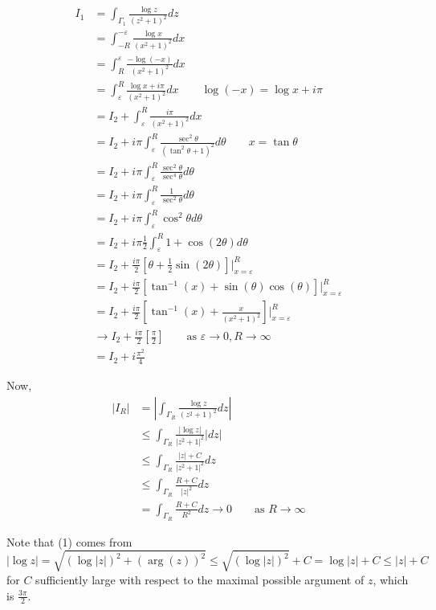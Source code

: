 \documentclass[12pt]{Homework}
\begin{document}
\begin{solution}
\begin{align*}
    I_1&=\int_{\Gamma_1}\frac{\log z}{(z^2+1)^2}dz\\
    &=\int_{-R}^{-\varepsilon}\frac{\log x}{(x^2+1)^2}dx\\
    &=\int_R^\varepsilon\frac{-\log(-x)}{(x^2+1)^2}dx\\
    &=\int_\varepsilon^R\frac{\log x+i\pi}{(x^2+1)^2}dx\qquad \log(-x)=\log x+i\pi\\
    &=I_2+\int_\varepsilon^R\frac{i\pi}{(x^2+1)^2}dx\\
    &=I_2+i\pi\int_\varepsilon^R\frac{\sec^2\theta}{(\tan^2\theta+1)^2}d\theta\qquad x=\tan\theta\\
    &=I_2+i\pi\int_\varepsilon^R\frac{\sec^2\theta}{\sec^4\theta}d\theta\\
    &=I_2+i\pi\int_\varepsilon^R\frac{1}{\sec^2\theta}d\theta\\
    &=I_2+i\pi\int_\varepsilon^R\cos^2\theta d\theta\\
    &=I_2+i\pi\frac{1}{2}\int_\varepsilon^R1+\cos(2\theta) d\theta\\
    &=I_2+\frac{i\pi}{2}\left[\theta+\frac{1}{2}\sin(2\theta)\right]\Big|_{x=\varepsilon}^R\\
    &=I_2+\frac{i\pi}{2}\left[\tan^{-1}(x)+\sin(\theta)\cos(\theta)\right]\Big|_{x=\varepsilon}^R\\
    &=I_2+\frac{i\pi}{2}\left[\tan^{-1}(x)+\frac{x}{(x^2+1)^2}\right]\Big|_{x=\varepsilon}^R\\
    &\to I_2+\frac{i\pi}{2}\left[\frac{\pi}{2}\right]\qquad\text{as }\varepsilon\to0,R\to\infty\\
    &=I_2+i\frac{\pi^2}{4}
\end{align*}



Now, \begin{align*}
    |I_R|&=\left|\int_{\Gamma_R}\frac{\log z}{(z^2+1)^2}dz\right|\\
    &\le \int_{\Gamma_R}\frac{|\log z|}{|z^2+1|^2}|dz|\\
    &\le\int_{\Gamma_R}\frac{|z|+C}{|z^2+1|^2}dz\tag{1}\\
    &\le\int_{\Gamma_R}\frac{R+C}{|z|^2}dz\tag{2}\\
    &=\int_{\Gamma_R}\frac{R+C}{R^2}dz\to0\qquad\text{as }R\to\infty
\end{align*}

Note that (1) comes from $$|\log z|=\sqrt{(\log |z|)^2+(\arg(z))^2}\le \sqrt{(\log|z|)^2}+C=\log|z|+C\le |z|+C$$ for $C$ sufficiently large with respect to the maximal possible argument of $z$, which is $\frac{3\pi}{2}.$


\end{solution}
\end{document}
